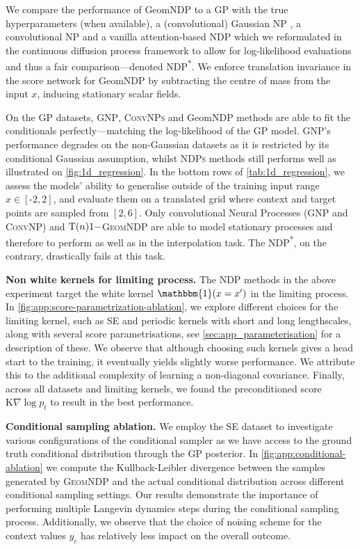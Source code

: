 We compare the performance of GeomNDP to a GP with the true hyperparameters (when available), a (convolutional) Gaussian NP \parencite{bruinsma2020Gaussian}, a convolutional NP \parencite{gordon2019Convolutional} and a vanilla attention-based NDP \parencite{dutordoir2022Neural} which we reformulated in the continuous diffusion process framework to allow for log-likelihood evaluations and thus a fair comparison---denoted NDP\textsuperscript{*}.
We enforce translation invariance in the score network for GeomNDP by subtracting the centre of mass from the input \(x\), inducing stationary scalar fields.

On the GP datasets, {\scshape GNP}, {\scshape ConvNPs} and GeomNDP methods are able to fit the conditionals perfectly---matching the log-likelihood of the GP model.
	{\scshape GNP}'s performance degrades on the non-Gaussian datasets as it is restricted by its conditional Gaussian assumption, whilst {\scshape NDPs} methods still performs well as illustrated on \cref{fig:1d_regression}.
In the bottom rows of \cref{tab:1d_regression}, we assess the models' ability to generalise outside of the training input range \(x \in [\text{-}2, 2]\), and evaluate them on a translated grid where context and target points are sampled from \([2,6]\).
Only convolutional Neural Processes ({\scshape GNP} and {\scshape ConvNP}) and {\scshape \(\mathrm{T}(n){1}-\)GeomNDP } are able to model stationary processes and therefore to perform as well as in the interpolation task.
The {\scshape NDP\textsuperscript{*}}, on the contrary, drastically fails at this task.


\textbf{Non white kernels for limiting process.}
The NDP methods in the above experiment target the white kernel \(\mathbbm{1}(x = x')\) in the limiting process.
In \cref{fig:app:score-parametrization-ablation}, we explore different choices for the limiting kernel, such as SE and periodic kernels with short and long lengthscales, along with several score parametrisations, see \cref{sec:app_parameterisation} for a description of these.
We observe that although choosing such kernels gives a head start to the training, it eventually yields slightly worse performance.
We attribute this to the additional complexity of learning a non-diagonal covariance.
Finally, across all datasets and limiting kernels, we found the preconditioned score \(\mathrm{K}\nabla \log p_t\) to result in the best performance.

\textbf{Conditional sampling ablation.}
We employ the SE dataset to investigate various configurations of the conditional sampler as we have access to the ground truth conditional distribution through the GP posterior.
In \cref{fig:app:conditional-ablation} we compute the Kullback-Leibler divergence between the samples generated by {\scshape GeomNDP } and the actual conditional distribution across different conditional sampling settings.
Our results demonstrate the importance of performing multiple Langevin dynamics steps during the conditional sampling process.
Additionally, we observe that the choice of noising scheme for the context values \(y_c\) has relatively less impact on the overall outcome.

